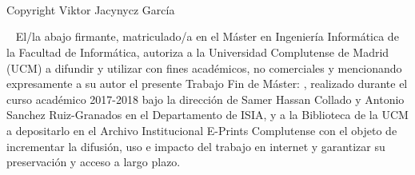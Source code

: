 {\mbox{ }

\begin{Huge}
\begin{center}
\tituloPortadaVal
\end{center}
\end{Huge}

\vfill %

\begin{large}
  \begin{center}
    \textoPrimerSubtituloPortadaVal\
\leavevmode \\\relax \mbox{ } \leavevmode \\\relax \mbox{ } \leavevmode \\\relax
\textoSegundoSubtituloPortadaVal \leavevmode \\[0.3em]
\end{center}
\end{large}

\vfill %

\begin{large}
\begin{center}
\textbf{\institucionVal}\leavevmode \\[0.2em]
    \mbox{ }  \leavevmode \\\relax
\textbf{\fechaPublicacionVal}
\end{center}
\end{large}


\newpage
\thispagestyle{empty}
\mbox{ }

\vskip 19cm
Copyright \textcopyright Viktor Jacynycz García

\newpage
\thispagestyle{empty}
\mbox{ }
\vskip 5cm
El/la abajo firmante, matriculado/a en el Máster en Ingeniería Informática de la
Facultad de Informática, autoriza a la Universidad Complutense de Madrid
(UCM) a difundir y utilizar con fines académicos, no comerciales y
mencionando expresamente a su autor el presente Trabajo Fin de Máster:
\emph{\tituloPortadaVal}, realizado durante el curso académico 2017-2018 bajo la dirección
de Samer Hassan Collado y Antonio Sanchez Ruiz-Granados en el
Departamento de ISIA, y a la Biblioteca de la UCM a depositarlo en el
Archivo Institucional E-Prints Complutense con el objeto de incrementar la
difusión, uso e impacto del trabajo en internet y garantizar su preservación y
acceso a largo plazo.



}%

